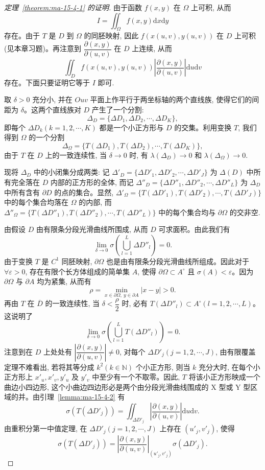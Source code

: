 \begin{proof}[{定理~\ref{theorem:ma-15-4-1} 的证明}]
由于函数 $f(x,y)$ 在 $\Omega$ 上可积, 从而
\[
  I=\iint_\Omega f(x,y)\mathrm dx\mathrm dy
\]
存在。由于 $T$ 是 $D$ 到 $\Omega$ 的同胚映射, 因此 $f(x(u,v),y(u,v))$ 在 $D$ 上可积(见本章习题)。再注意到 $\dfrac{\partial(x,y)}{\partial(u,v)}$ 在 $D$ 上连续, 从而
\[
  \iint_D f(x(u,v),y(u,v))
  \left|\frac{\partial(x,y)}{\partial(u,v)}\right|\mathrm du\mathrm dv
\]
存在。下面只要证明它等于 $I$ 即可.

取 $\delta>0$ 充分小, 并在 $Ouv$ 平面上作平行于两坐标轴的两个直线族, 使得它们的间距为 $\delta$。这两个直线族对 $D$ 产生了一个分割:
\[
  \Delta_D=\{\Delta D_1,\Delta D_2,\cdots,\Delta D_K\},
\]
即每个 $\Delta D_k(k=1,2,\cdots,K)$ 都是一个小正方形与 $D$ 的交集。利用变换 $T$, 我们得到 $\Omega$ 的一个分割
\[
  \Delta_\Omega=\{T(\Delta D_1),T(\Delta D_2),\cdots,T(\Delta D_K)\},
\]
由于 $T$ 在 $D$ 上的一致连续性, 当 $\delta\to0$ 时, 有 $\lambda(\Delta_D)\to0$ 和 $\lambda(\Delta_\Omega)\to0$.

现将 $\Delta_D$ 中的小闭集分成两类: 记 $\Delta'_D=\{\Delta D'_1,\Delta D'_2,\cdots,\Delta D'_J\}$ 为 $\Delta(D)$ 中所有完全落在 $D$ 内部的正方形的全体, 而记 $\Delta''_D=\{\Delta D''_1,\Delta D''_2,\cdots,\Delta D''_L\}$ 为 $\Delta_D$ 中所有含有 $\partial D$ 的点的集合。显然, $\Delta'_\Omega=\{T(\Delta D'_1),T(\Delta D'_2),\cdots,T(\Delta D'_J)\}$ 中的每个集合均落在 $\Omega$ 的内部, 而 $\Delta''_\Omega=\{T(\Delta D''_1),T(\Delta D''_2),\cdots,T(\Delta D''_L)\}$ 中的每个集合均与 $\partial\Omega$ 的交非空.

由假设 $D$ 由有限条分段光滑曲线所围成, 从而 $D$ 可求面积。由此我们有
\[
  \lim_{\delta\to0}\sigma\left(\bigcup_{l=1}^L\Delta D''_l\right)=0.
\]
由于变换 $T$ 是 $C^1$ 同胚映射, $\partial\Omega$ 也是由有限条分段光滑曲线所组成。因此对于 $\forall\varepsilon>0$, 存在有限个长方体组成的简单集 $A$, 使得 $\partial\Omega\subset A^\circ$ 且 $\sigma(A)<\varepsilon$。因为 $\partial\Omega$ 与 $\partial A$ 均为紧集, 从而有
\[
  \rho=\min_{x\in\partial\Omega,\ y\in\partial A}|x-y|>0.
\]
再由 $T$ 在 $\overline D$ 的一致连续性, 当 $\delta<\dfrac\rho2$ 时, 必有 $T(\Delta D''_l)\subset A^\circ(l=1,2,\cdots,L)$。这说明了
\[
  \lim_{\delta\to0}\sigma\left(\bigcup_{l=1}^LT(\Delta D''_l)\right)=0.
\]
注意到在 $D$ 上处处有 $\left|\dfrac{\partial(x,y)}{\partial(u,v)}\right|\ne0$, 对每个 $\Delta D'_j(j=1,2,\cdots,J)$, 由有限覆盖定理不难看出, 若将其等分成 $k^2(k\in\mathbb N)$ 个小正方形, 则当 $k$ 充分大时, 在每个小正方形上 $x'_u,x'_v,y'_u$ 及 $y'_v$ 中至少有一个不取零。因此, $T$ 将该小正方形映成一个曲边小四边形, 这个小曲边四边形必是两个由分段光滑曲线围成的 X 型或 Y 型区域的并。由引理~\ref{lemma:ma-15-4-2} 有
\[
  \sigma(T(\Delta D'_j))
  =\iint_{\Delta D'_j}\left|\frac{\partial(x,y)}{\partial(u,v)}\right|\mathrm du\mathrm dv.
\]
由重积分第一中值定理, 在 $\Delta D'_j(j=1,2,\cdots,J)$ 上存在 $(u'_j,v'_j)$, 使得
\[
  \sigma(T(\Delta D'_j))
  =\left|\frac{\partial(x,y)}{\partial(u,v)}\right|_{(u'_j,v'_j)}
  \sigma(\Delta D'_j).
\]


\end{proof}
